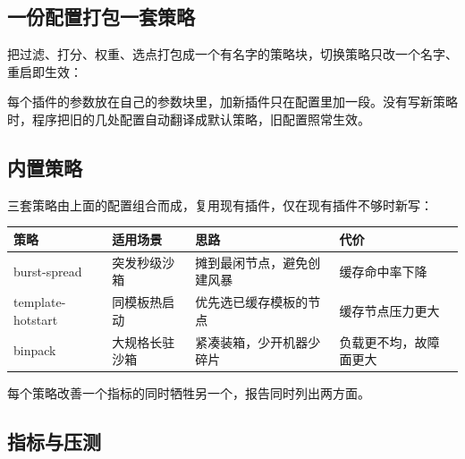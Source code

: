 \documentclass[UTF8,fontset=none,zihao=-4]{ctexart}
\begin{document}
\subsection*{一份配置打包一套策略}

把过滤、打分、权重、选点打包成一个有名字的策略块，切换策略只改一个名字、重启即生效：

\begin{center}
\end{center}

每个插件的参数放在自己的参数块里，加新插件只在配置里加一段。没有写新策略时，程序把旧的几处配置自动翻译成默认策略，旧配置照常生效。

\subsection*{内置策略}

三套策略由上面的配置组合而成，复用现有插件，仅在现有插件不够时新写：

\begin{table}[H]
\centering\small
\begin{tabularx}{\textwidth}{L{0.20\textwidth}L{0.20\textwidth}L{0.32\textwidth}L{0.28\textwidth}}
\toprule
\textbf{策略} & \textbf{适用场景} & \textbf{思路} & \textbf{代价} \\
\midrule
burst-spread & 突发秒级沙箱 & 摊到最闲节点，避免创建风暴 & 缓存命中率下降 \\
template-hotstart & 同模板热启动 & 优先选已缓存模板的节点 & 缓存节点压力更大 \\
binpack & 大规格长驻沙箱 & 紧凑装箱，少开机器少碎片 & 负载更不均，故障面更大 \\
\bottomrule
\end{tabularx}
\end{table}

每个策略改善一个指标的同时牺牲另一个，报告同时列出两方面。

\subsection*{指标与压测}
\end{document}
